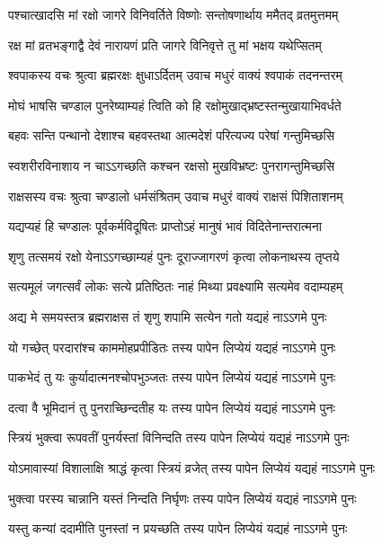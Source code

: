 \twolineshloka
{पश्चात्खादसि मां रक्षो जागरे विनिवर्तिते}
{विष्णोः सन्तोषणार्थाय ममैतद् व्रतमुत्तमम्}%

\twolineshloka
{रक्ष मां व्रतभङ्गाद्वै देवं नारायणं प्रति}
{जागरे विनिवृत्ते तु मां भक्षय यथेप्सितम्}%

\twolineshloka
{श्वपाकस्य वचः श्रुत्वा ब्रह्मरक्षः क्षुधाऽर्दितम्}
{उवाच मधुरं वाक्यं श्वपाकं तदनन्तरम्}%

\twolineshloka
{मोघं भाषसि चण्डाल पुनरेष्याम्यहं त्विति}
{को हि रक्षोमुखाद्भ्रष्टस्तन्मुखायाभिवर्धते}%

\twolineshloka
{बहवः सन्ति पन्थानो देशाश्च बहवस्तथा}
{आत्मदेशं परित्यज्य परेषां गन्तुमिच्छसि}%

\twolineshloka
{स्वशरीरविनाशाय न चाऽऽगच्छति कश्चन}
{रक्षसो मुखविभ्रष्टः पुनरागन्तुमिच्छसि}%

\twolineshloka
{राक्षसस्य वचः श्रुत्वा चण्डालो धर्मसंश्रितम्}
{उवाच मधुरं वाक्यं राक्षसं पिशिताशनम्}%

\twolineshloka
{यद्यप्यहं हि चण्डालः पूर्वकर्मविदूषितः}
{प्राप्तोऽहं मानुषं भावं विदितेनान्तरात्मना}%

\twolineshloka
{शृणु तत्समयं रक्षो येनाऽऽगच्छाम्यहं पुनः}
{दूराज्जागरणं कृत्वा लोकनाथस्य तृप्तये}%

\twolineshloka
{सत्यमूलं जगत्सर्वं लोकः सत्ये प्रतिष्ठितः}
{नाहं मिथ्या प्रवक्ष्यामि सत्यमेव वदाम्यहम्}%

\twolineshloka
{अद्य मे समयस्तत्र ब्रह्मराक्षस तं शृणु}
{शपामि सत्येन गतो यद्यहं नाऽऽगमे पुनः}%

\twolineshloka
{यो गच्छेत् परदारांश्च काममोहप्रपीडितः}
{तस्य पापेन लिप्येयं यद्यहं नाऽऽगमे पुनः}%

\twolineshloka
{पाकभेदं तु यः कुर्यादात्मनश्चोपभुञ्जतः}
{तस्य पापेन लिप्येयं यद्यहं नाऽऽगमे पुनः}%

\twolineshloka
{दत्वा वै भूमिदानं तु पुनराच्छिन्दतीह यः}
{तस्य पापेन लिप्येयं यद्यहं नाऽऽगमे पुनः}%

\twolineshloka
{स्त्रियं भुक्त्वा रूपवतीं पुनर्यस्तां विनिन्दति}
{तस्य पापेन लिप्येयं यद्यहं नाऽऽगमे पुनः}%

\twolineshloka
{योऽमावास्यां विशालाक्षि श्राद्धं कृत्वा स्त्रियं व्रजेत्}
{तस्य पापेन लिप्येयं यद्यहं नाऽऽगमे पुनः}%

\twolineshloka
{भुक्त्वा परस्य चान्नानि यस्तं निन्दति निर्घृणः}
{तस्य पापेन लिप्येयं यद्यहं नाऽऽगमे पुनः}%

\twolineshloka
{यस्तु कन्यां ददामीति पुनस्तां न प्रयच्छति}
{तस्य पापेन लिप्येयं यद्यहं नाऽऽगमे पुनः}%

